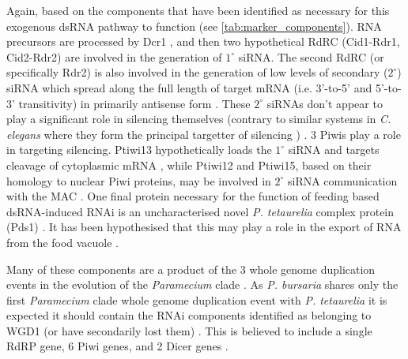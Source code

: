 Again, based on the components that have been identified as necessary
for this exogenous dsRNA pathway to function (see \cref{tab:marker_components}).  
RNA precursors are processed
by Dcr1 \citep{Lepere2009}, and then two hypothetical RdRC (Cid1-Rdr1, Cid2-Rdr2)
\citep{Marker2010,Marker2014} are involved in the generation of \(1^{\circ}\) 
siRNA.  
The second RdRC (or specifically Rdr2) is also involved in the generation
of low levels of secondary (\(2^{\circ}\)) siRNA which spread along the full length of
target mRNA (i.e. 3'-to-5' and 5'-to-3' transitivity) in primarily
antisense form \citep{Carradec2015}.  These \(2^{\circ}\) siRNAs don't
appear to play a significant role in silencing themselves (contrary to similar
systems in \textit{C. elegans} where they form the principal targetter of silencing 
\citep{Sijen2007,Pak2007}) \citep{Carradec2015}.
3 Piwis play a role in targeting silencing.  Ptiwi13 hypothetically
loads the \(1^{\circ}\) siRNA and targets cleavage of cytoplasmic mRNA \citep{Bouhouche2011},
while Ptiwi12 and Ptiwi15, based on their homology to nuclear Piwi proteins,
\citep{Marker2014,Carradec2015,Bouhouche2011} may be involved
in \(2^{\circ}\) siRNA communication with the MAC \citep{Carradec2015}.
One final protein necessary for the function of feeding based dsRNA-induced
RNAi is an uncharacterised novel \textit{P. tetaurelia} complex protein (Pds1) \citep{Marker2014}.
It has been hypothesised that this may play a role in the export of RNA from 
the food vacuole \citep{Carradec2015}.


Many of these components are a product of the 3 whole genome duplication
events in the evolution of the \textit{Paramecium} clade \citep{McGrath2014}.
As \textit{P. bursaria} shares only the first \textit{Paramecium} clade whole
genome duplication event with \textit{P. tetaurelia} it is expected
it should contain the RNAi components identified as belonging to WGD1 (or have 
secondarily lost them) \citep{McGrath2014}.
This is believed to include a single RdRP gene, 6 Piwi genes, and 2 Dicer genes \citep{Marker2014}.




